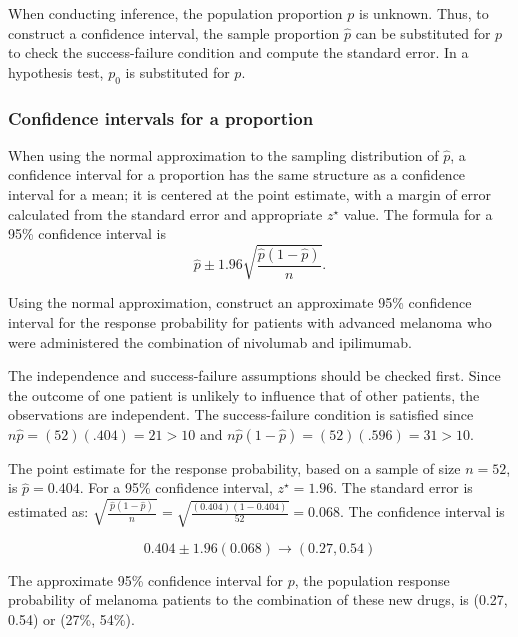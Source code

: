 When conducting inference, the population proportion $p$ is unknown. Thus, to construct a confidence interval, the sample proportion $\hat{p}$ can be substituted for $p$ to check the success-failure condition and compute the standard error. In a hypothesis test, $p_0$ is substituted for $p$.

\subsubsection{Confidence intervals for a proportion}
\label{confIntForPropSection}


When using the normal approximation to the sampling distribution of $\hat{p}$, a confidence interval for a proportion has the same structure as a confidence interval for a mean; it is centered at the point estimate, with a margin of error calculated from the standard error and appropriate $z^{\star}$ value.  The formula for a 95\% confidence interval is
\[
  \hat{p} \pm 1.96 \sqrt{\frac{\hat{p}(1-\hat{p})}{n}}.
\]


\begin{example}{Using the normal approximation, construct an approximate 95\% confidence interval for the response probability for patients with advanced melanoma who were administered the combination of nivolumab and ipilimumab.}

The independence and success-failure assumptions should be checked first.  Since the outcome of one patient is unlikely to influence that of other patients, the observations are independent.  The success-failure condition is satisfied since $n\hat{p} = (52)(.404) = 21  > 10$ and $n\hat{p}(1 - \hat{p}) = (52)(.596) = 31  > 10$.

The point estimate for the response probability, based on a sample of size $n = 52$, is $\hat{p} = 0.404$. For a 95\% confidence interval, $z^{\star} = 1.96$. The standard error is estimated as: $\sqrt{\frac{\ \hat{p}(1-\hat{p})\ }{n}} = \sqrt{\frac{(0.404)(1-0.404)}{52}} = 0.068$.  The confidence interval is

\[0.404 \pm 1.96 (0.068) \rightarrow (0.27, 0.54) \]

The approximate 95\% confidence interval for $p$, the population response probability of melanoma patients to the combination of these new drugs, is (0.27, 0.54) or (27\%, 54\%).  

\end{example}

